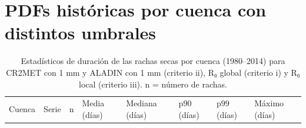 \section{PDFs históricas por cuenca con distintos umbrales}\label{sec:S2}

\begin{longtable}[]{@{}
  >{\raggedright\arraybackslash}p{}
  >{\raggedright\arraybackslash}p{}
  >{\raggedright\arraybackslash}p{}
  >{\raggedright\arraybackslash}p{}
  >{\raggedright\arraybackslash}p{}
  >{\raggedright\arraybackslash}p{}
  >{\raggedright\arraybackslash}p{}
  >{\raggedright\arraybackslash}p{}@{}}
\caption[Estadísticos de duración de las rachas secas por cuenca (1980--2014) para CR2MET con 1 mm y ALADIN con 1 mm (criterio ii), R₀ global (criterio i) y R₀ local (criterio iii)]{Estadísticos de duración de las rachas secas por cuenca (1980--2014) para CR2MET con 1 mm y ALADIN con 1 mm (criterio ii), R₀ global (criterio i) y R₀ local (criterio iii). n = número de rachas.}\label{tab:S2}\tabularnewline
\toprule\noalign{}
\begin{minipage}[b]{\linewidth}\raggedright
Cuenca
\end{minipage} & \begin{minipage}[b]{\linewidth}\raggedright
Serie
\end{minipage} & \begin{minipage}[b]{\linewidth}\raggedright
n
\end{minipage} & \begin{minipage}[b]{\linewidth}\raggedright
Media (días)
\end{minipage} & \begin{minipage}[b]{\linewidth}\raggedright
Mediana (días)
\end{minipage} & \begin{minipage}[b]{\linewidth}\raggedright
p90 (días)
\end{minipage} & \begin{minipage}[b]{\linewidth}\raggedright
p99 (días)
\end{minipage} & \begin{minipage}[b]{\linewidth}\raggedright
Máximo (días)
\end{minipage} \\

\end{longtable}

